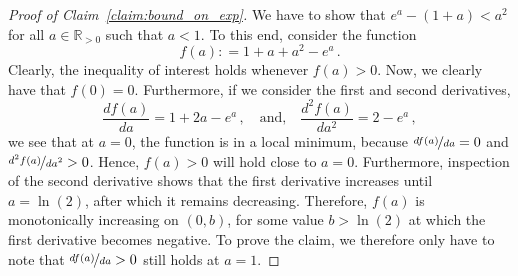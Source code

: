 \documentclass[10pt]{paper}
\theoremstyle{definition}
\newcommand{\reals}{\mathbb{R}}
\newcommand{\realspos}{\reals_{>0}}
\newcommand{\coloneqq}{:\!=}
\begin{document}
\begin{proof}[Proof of Claim~\ref{claim:bound_on_exp}]
We have to show that $e^a-(1+a)<a^2$ for all $a\in\realspos$ such that $a<1$. To this end, consider the function
\begin{equation*}
f(a) \coloneqq 1 + a + a^2 - e^a\,.
\end{equation*}
Clearly, the inequality of interest holds whenever $f(a)>0$. Now, we clearly have that $f(0)=0$. Furthermore, if we consider the first and second derivatives,
\begin{equation*}
\frac{d f(a)}{d a}=1+2a-e^a\,,\quad\text{and,}\quad\frac{d^2 f(a)}{da^2}=2-e^a\,,
\end{equation*}
we see that at $a=0$, the function is in a local minimum, because $\nicefrac{df(a)}{da}=0$ and $\nicefrac{d^2f(a)}{da^2}>0$. Hence, $f(a)>0$ will hold close to $a=0$. Furthermore, inspection of the second derivative shows that the first derivative increases until $a=\ln(2)$, after which it remains decreasing. Therefore, $f(a)$ is monotonically increasing on $(0,b)$, for some value $b>\ln(2)$ at which the first derivative becomes negative. To prove the claim, we therefore only have to note that $\nicefrac{df(a)}{da} > 0$ still holds at $a=1$.
\end{proof}
\end{document}
